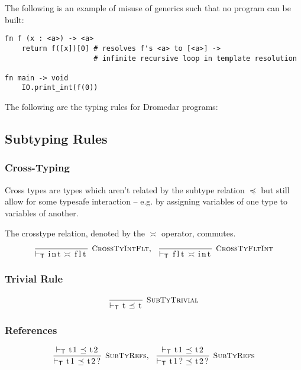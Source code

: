 \documentclass{article}
\newcommand{\code}[1]{\lstinline[columns=fixed]{#1}}
\newcommand{\drmrule}[5]{\frac{#1}{#2\vdash_{\mathsf{#3}}#4}\textsc{\ \small{#5}}}
\newcommand{\ruleapp}[1]{\vdash_{\mathsf{#1}}}
\newcommand{\mc}[1]{\textnormal{\code{#1}}}
\begin{document}
		The following is an example of misuse of generics such that no program can be built:
		
		\begin{lstlisting}
fn f (x : <a>) -> <a>
	return f([x])[0] # resolves f's <a> to [<a>] ->
					 # infinite recursive loop in template resolution

fn main -> void
	IO.print_int(f(0))
		\end{lstlisting}
		
		The following are the typing rules for Dromedar programs:
		
		\subsection{Subtyping Rules}
		
			\subsubsection{Cross-Typing}
			
				Cross types are types which aren't related by the subtype relation $\preceq$ but still allow for some typesafe interaction -- e.g. by assigning variables of one type to variables of another.
				
				The crosstype relation, denoted by the $\asymp$ operator, commutes.
				\begin{align*}
					\drmrule{}{}{T}{\mc{int} \asymp \mc{flt}}{CrossTyIntFlt},\ \ 
					\drmrule{}{}{T}{\mc{flt} \asymp \mc{int}}{CrossTyFltInt}
				\end{align*}
		
			\subsubsection{Trivial Rule}
			
				\begin{align*}
					\drmrule{}{}{T}{\mc{t} \preceq \mc{t}}{SubTyTrivial}
				\end{align*}
				
			\subsubsection{References}
			
				\begin{align*}
					\drmrule{\ruleapp{T}\mc{t1} \preceq \mc{t2}}{}{T}{\mc{t1} \preceq \mc{t2?}}{SubTyRefs},\ \ 
					\drmrule{\ruleapp{T}\mc{t1}\preceq\mc{t2}}{}{T}{\mc{t1?} \preceq \mc{t2?}}{SubTyRefs}
				\end{align*}
				
\end{document}
